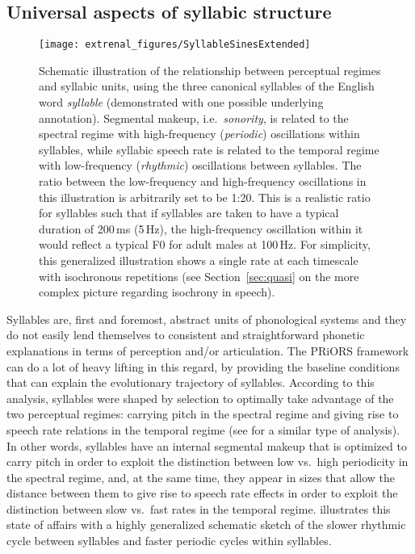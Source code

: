 \subsection{Universal aspects of syllabic structure}\label{sec:universal}

\begin{figure}
\texttt{[image: extrenal\_figures/SyllableSinesExtended]} 
\caption{Schematic illustration of the relationship between perceptual regimes and syllabic units, using the three canonical syllables of the English word \emph{syllable} (demonstrated with one possible underlying annotation). Segmental makeup, i.e.~\emph{sonority}, is related to the spectral regime with high-frequency (\emph{periodic}) oscillations within syllables, while syllabic speech rate is related to the temporal regime with low-frequency (\emph{rhythmic}) oscillations between syllables. The ratio between the low-frequency and high-frequency oscillations in this illustration is arbitrarily set to be 1:20. This is a realistic ratio for syllables such that if syllables are taken to have a typical duration of 200\,ms (5\,Hz), the high-frequency oscillation within it would reflect a typical F0 for adult males at 100\,Hz. For simplicity, this generalized illustration shows a single rate at each timescale with isochronous repetitions (see Section~\ref{sec:quasi} on the more complex picture regarding isochrony in speech).%
}\label{fig:syll-sines}
\end{figure}

Syllables are, first and foremost, abstract units of phonological systems and they do not easily lend themselves to consistent and straightforward phonetic explanations in terms of perception and/or articulation.
The PRiORS framework can do a lot of heavy lifting in this regard, by providing the baseline conditions that can explain the evolutionary trajectory of syllables. According to this analysis, syllables were shaped by selection to optimally take advantage of the two perceptual regimes:
carrying pitch in the spectral regime and giving rise to speech rate relations in the temporal regime
(see \citealt{rasanen2018pre} for a similar type of analysis).
In other words, syllables have an internal segmental makeup that is optimized to carry pitch in order to exploit the distinction between low vs.~high periodicity in the spectral regime, and, at the same time, they appear in sizes that allow the distance between them to give rise to speech rate effects in order to exploit the distinction between slow vs.~fast rates in the temporal regime.
 illustrates this state of affairs with a highly generalized schematic sketch of the slower rhythmic cycle between syllables and faster periodic cycles within syllables.

